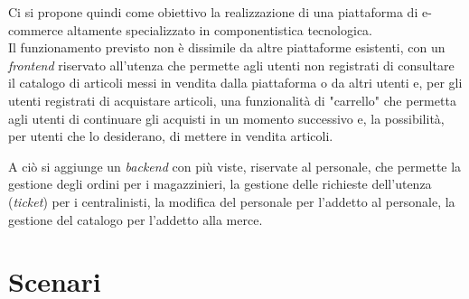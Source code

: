 \documentclass[12pt,a4paper]{article}
\begin{document}
Ci si propone quindi come obiettivo la realizzazione di una piattaforma di e-commerce altamente specializzato in componentistica tecnologica. \\

\noindent
Il funzionamento previsto non è dissimile da altre piattaforme esistenti, con un \emph{frontend} riservato all'utenza che permette agli utenti non registrati di consultare il catalogo di articoli messi in vendita dalla piattaforma o da altri utenti e, per gli utenti registrati di acquistare articoli, una funzionalità di "carrello" che permetta agli utenti di continuare gli acquisti in un momento successivo e, la possibilità, per utenti che lo desiderano, di mettere in vendita articoli.

A ciò si aggiunge un \emph{backend} con più viste, riservate al personale, che permette la gestione degli ordini per i magazzinieri, la gestione delle richieste dell'utenza (\emph{ticket}) per i centralinisti, la modifica del personale per l'addetto al personale, la gestione del catalogo per l'addetto alla merce.


\newpage
\section{Scenari}
\end{document}

